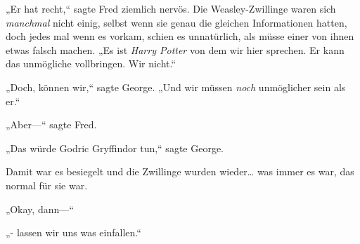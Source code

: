 „Er hat recht,“ sagte Fred ziemlich nervös. Die Weasley-Zwillinge waren sich \emph{manchmal} nicht einig, selbst wenn sie genau die gleichen Informationen hatten, doch jedes mal wenn es vorkam, schien es unnatürlich, als müsse einer von ihnen etwas falsch machen. „Es ist \emph{Harry Potter} von dem wir hier sprechen. Er kann das unmögliche vollbringen. Wir nicht.“

„Doch, können wir,“ sagte George. „Und wir müssen \emph{noch} unmöglicher sein als er.“

„Aber—“ sagte Fred.

„Das würde Godric Gryffindor tun,“ sagte George.

Damit war es besiegelt und die Zwillinge wurden wieder… was immer es war, das normal für sie war.

„Okay, dann—“

„- lassen wir uns was einfallen.“

